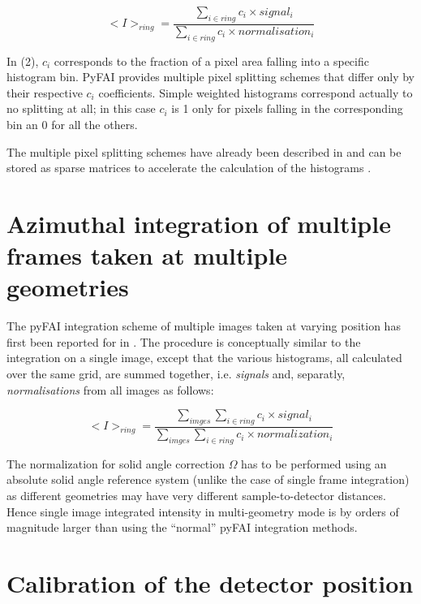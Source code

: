 \documentclass[preprint, pdf]{iucr}              %
\begin{document}
\begin{equation}
<I>_{ring} = \frac{\sum\limits_{i \in ring} c_i \times signal_i}
                  {\sum\limits_{i \in ring} c_i \times normalisation_i} 
\end{equation}

In (2), $c_i$ corresponds to the fraction of a pixel area 
falling into a specific histogram bin. 
PyFAI provides multiple pixel splitting schemes that differ only by their
respective $c_i$ coefficients. 
Simple weighted histograms correspond actually to no splitting at all; in this
case $c_i$ is 1 only for pixels falling in the corresponding bin an 0 for all
the others.
  
The multiple pixel splitting schemes have already been described in
 \cite{fv5028} and can be stored as sparse matrices to accelerate the
 calculation of the histograms  \cite{kieffer_ashiotis-proc-euroscipy-2014}.

\section{Azimuthal integration of multiple frames taken at multiple geometries}

The pyFAI integration scheme of multiple images taken at varying position has
first been reported for  in  \cite{PyFAI_PDJ}. 
The procedure is conceptually similar to the integration on a single image,
except that the various histograms, all calculated over the same
grid, are summed together, i.e. \textit{signals} and, separatly, 
\textit{normalisations} from all images as follows: 

\begin{equation}
<I>_{ring} = \frac{\sum\limits_{imges} \sum\limits_{i \in ring} c_i \times
signal_i} {\sum\limits_{imges} \sum\limits_{i \in ring} c_i \times
normalization_i} 
\end{equation}

The normalization for solid angle correction $\Omega$ has to be performed
using an absolute solid angle reference system (unlike the case of single
frame integration) as different geometries may have very different
sample-to-detector distances.
Hence single image integrated intensity in multi-geometry mode is by orders of
magnitude larger than using the ``normal'' pyFAI integration methods.

\section{Calibration of the detector position}
\end{document}

